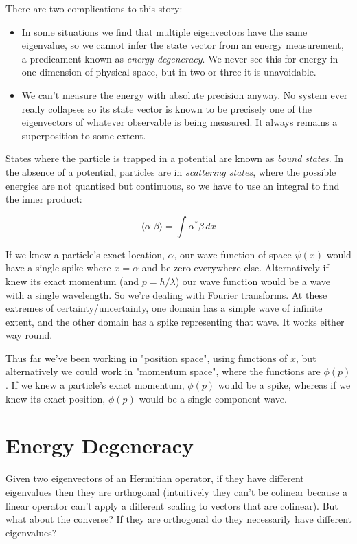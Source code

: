 There are two complications to this story:

\begin{itemize}
  \item In some situations we find that multiple eigenvectors have the same eigenvalue, so we cannot infer the state vector from an energy measurement, a predicament known as \textit{energy degeneracy}. We never see this for energy in one dimension of physical space, but in two or three it is unavoidable.
  \item We can't measure the energy with absolute precision anyway. No system ever really collapses so its state vector is known to be precisely one of the eigenvectors of whatever observable is being measured. It always remains a superposition to some extent.
\end{itemize}

States where the particle is trapped in a potential are known as \textit{bound states}. In the absence of a potential, particles are in \textit{scattering states}, where the possible energies are not quantised but continuous, so we have to use an integral to find the inner product:

$$
\langle \alpha | \beta \rangle
=
\int
\alpha^* \beta \,dx
$$

If we knew a particle's exact location, $\alpha$, our wave function of space $\psi(x)$ would have a single spike where $x = \alpha$ and be zero everywhere else. Alternatively if knew its exact momentum (and $p=h/\lambda$) our wave function would be a wave with a single wavelength. So we're dealing with Fourier transforms. At these extremes of certainty/uncertainty, one domain has a simple wave of infinite extent, and the other domain has a spike representing that wave. It works either way round.

Thus far we've been working in "position space", using functions of $x$, but alternatively we could work in "momentum space", where the functions are $\phi(p)$. If we knew a particle's exact momentum, $\phi(p)$ would be a spike, whereas if we knew its exact position, $\phi(p)$ would be a single-component wave.

\section{Energy Degeneracy}

Given two eigenvectors of an Hermitian operator, if they have different eigenvalues then they are orthogonal (intuitively they can't be colinear because a linear operator can't apply a different scaling to vectors that are colinear). But what about the converse? If they are orthogonal do they necessarily have different eigenvalues?

